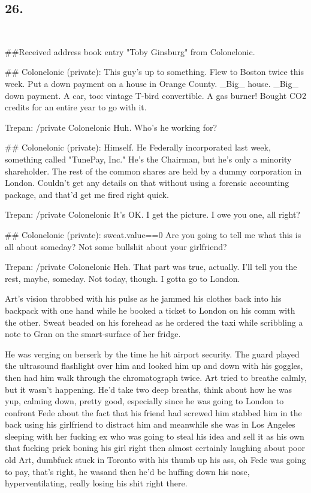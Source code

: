\subsection{26.}
{\raggedright
\tt
\addtolength{\parskip}{0.5\baselineskip}

\#\#Received address book entry "Toby Ginsburg" from Colonelonic.

\#\# Colonelonic (private): This guy's up to something. Flew to
Boston twice this week. Put a down payment on a house in Orange
County. \_Big\_ house. \_Big\_ down payment. A car, too: vintage
T-bird convertible. A gas burner! Bought CO2 credits for an entire
year to go with it.

Trepan: /private Colonelonic Huh. Who's he working for?

\#\# Colonelonic (private): Himself. He Federally incorporated last
week, something called "TunePay, Inc." He's the Chairman, but he's
only a minority shareholder. The rest of the common shares are held
by a dummy corporation in London. Couldn't get any details on that
without using a forensic accounting package, and that'd get me
fired right quick.

Trepan: /private Colonelonic It's OK. I get the picture. I owe you
one, all right?

\#\# Colonelonic (private): sweat.value==0 Are you going to tell me
what this is all about someday? Not some bullshit about your
girlfriend?

Trepan: /private Colonelonic Heh. That part was true, actually.
I'll tell you the rest, maybe, someday. Not today, though. I gotta
go to London.

}
\bigskip
Art’s vision throbbed with his pulse as he jammed his clothes back
into his backpack with one hand while he booked a ticket to London
on his comm with the other. Sweat beaded on his forehead as he
ordered the taxi while scribbling a note to Gran on the
smart-surface of her fridge.

He was verging on berserk by the time he hit airport security. The
guard played the ultrasound flashlight over him and looked him up
and down with his goggles, then had him walk through the
chromatograph twice. Art tried to breathe calmly, but it wasn’t
happening. He’d take two deep breaths, think about how he was yup,
calming down, pretty good, especially since he was going to London
to confront Fede about the fact that his friend had screwed him
stabbed him in the back using his girlfriend to distract him and
meanwhile she was in Los Angeles sleeping with her fucking ex who
was going to steal his idea and sell it as his own that fucking
prick boning his girl right then almost certainly laughing about
poor old Art, dumbfuck stuck in Toronto with his thumb up his ass,
oh Fede was going to pay, that’s right, he was{\dash}and then he’d be
huffing down his nose, hyperventilating, really losing his shit
right there.

